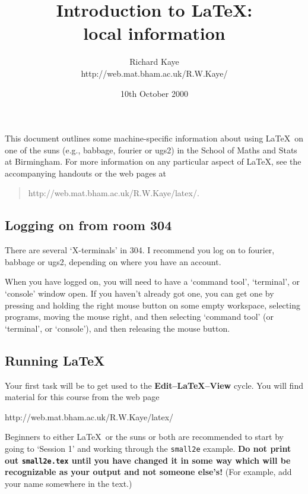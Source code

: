 \documentclass[a4paper,12pt]{article}
\newcommand\href[2]{#2}
\begin{document}
\title{Introduction to \LaTeX:\\local information}
\author{Richard Kaye\\\href{http://web.mat.bham.ac.uk/R.W.Kaye/}{http://web.mat.bham.ac.uk/R.W.Kaye/}}
\date{10th October 2000}

\maketitle

This document outlines some machine-specific information
about using \LaTeX\ on one of the suns (e.g., babbage, fourier or ugs2)
in the School of Maths and Stats at Birmingham. For more information on 
any particular aspect of \LaTeX, see the accompanying handouts 
or the web pages at
\begin{quote}
\href{http://web.mat.bham.ac.uk/R.W.Kaye/latex/}{http://web.mat.bham.ac.uk/R.W.Kaye/latex/}.
\end{quote}

\subsection*{Logging on from room 304}

There are several `X-terminals' in 304.  I recommend you log
on to fourier, babbage or ugs2, depending on where you have
an account.  

When you have logged on, you will need to have a `command tool', `terminal',
or `console' window open.  If you haven't already got one, you can get one
by pressing and holding the right mouse button on some empty workspace,
selecting programs, moving the mouse right, and then selecting `command 
tool' (or `terminal', or `console'), and then releasing the mouse button.

\subsection*{Running \LaTeX}

Your first task will be to get used to the \textbf{Edit--\LaTeX--View} cycle.
You will find material for this course from the web page
\begin{center}
\href{http://web.mat.bham.ac.uk/R.W.Kaye/latex/}{http://web.mat.bham.ac.uk/R.W.Kaye/latex/}
\end{center}
Beginners to either \LaTeX\ or the 
suns or both are recommended to start by going to `Session 1' 
and working through the \verb|small2e| example. 
\textbf{Do not print out \texttt{small2e.tex} until
you have changed it in some way which will be
recognizable as your output and not someone else's!}  
(For example, add your name somewhere in the text.)
\end{document}

